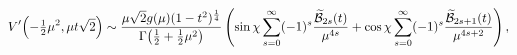 \[\mathop{V\/}\nolimits'\!\left(-\tfrac{1}{2}\mu^{2},\mu t\sqrt{2}\right)\sim%
\frac{\mu\sqrt{2}g(\mu)(1-t^{2})^{\frac{1}{4}}}{\mathop{\Gamma\/}\nolimits\!%
\left(\tfrac{1}{2}+\tfrac{1}{2}\mu^{2}\right)}\*\left(\mathop{\sin\/}\nolimits%
\chi\sum_{s=0}^{\infty}(-1)^{s}\frac{\widetilde{\cal{B}}_{2s}(t)}{\mu^{4s}}+%
\mathop{\cos\/}\nolimits\chi\sum_{s=0}^{\infty}(-1)^{s}\frac{\widetilde{\cal{B%
}}_{2s+1}(t)}{\mu^{4s+2}}\right),\]